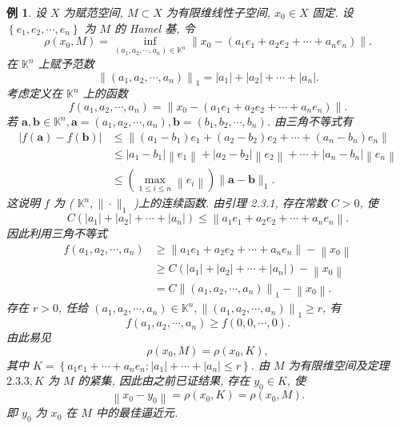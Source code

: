 \documentclass[openany]{ctexbook}
\theoremstyle{kaiti}
\theoremstyle{normal}
\newtheorem{example}{例}[section]
\begin{document}
\begin{example}
设 $X$ 为赋范空间, $M \subset X$ 为有限维线性子空间, $x_0 \in X$ 固定. 设 $\left\{e_1, e_2, \cdots, e_n\right\}$ 为 $M$ 的 Hamel 基, 令
$$
\rho\left(x_0, M\right)=\inf_{\left(a_1, a_2, \cdots, a_n\right) \in \mathbb{K}^n}\left\|x_0-\left(a_1 e_1+a_2 e_2+\cdots+a_n e_n\right)\right\|.
$$
在 $\mathbb{K}^n$ 上赋予范数
$$
\left\|\left(a_1, a_2, \cdots, a_n\right)\right\|_1=\left|a_1\right|+\left|a_2\right|+\cdots+\left|a_n\right|.
$$
考虑定义在 $\mathbb{K}^n$ 上的函数
$$
f\left(a_1, a_2, \cdots, a_n\right)=\left\|x_0-\left(a_1 e_1+a_2 e_2+\cdots+a_n e_n\right)\right\|.
$$
若 $\boldsymbol{a}, \boldsymbol{b} \in \mathbb{K}^n, \boldsymbol{a}=\left(a_1, a_2, \cdots, a_n\right), \boldsymbol{b}=\left(b_1, b_2, \cdots, b_n\right)$. 由三角不等式有
$$
\begin{aligned}
|f(\boldsymbol{a})-f(\boldsymbol{b})| & \leqslant\left\|\left(a_1-b_1\right) e_1+\left(a_2-b_2\right) e_2+\cdots+\left(a_n-b_n\right) e_n\right\| \\
& \leqslant\left|a_1-b_1\right|\left\|e_1\right\|+\left|a_2-b_2\right|\left\|e_2\right\|+\cdots+\left|a_n-b_n\right|\left\|e_n\right\| \\
& \leqslant\left(\max_{1 \leqslant i \leqslant n}\left\|e_{i}\right\|\right)\|\boldsymbol{a}-\boldsymbol{b}\|_1.
\end{aligned}
$$
这说明 $f$ 为 ( $\mathbb{K}^n,\|\cdot\|_1$ )上的连续函数. 由引理 2.3.1, 存在常数 $C>0$, 使
$$
C\left(\left|a_1\right|+\left|a_2\right|+\cdots+\left|a_n\right|\right) \leqslant\left\|a_1 e_1+a_2 e_2+\cdots+a_n e_n\right\|.
$$
因此利用三角不等式
$$
\begin{aligned}
f\left(a_1, a_2, \cdots, a_n\right) & \geqslant\left\|a_1 e_1+a_2 e_2+\cdots+a_n e_n\right\|-\left\|x_0\right\| \\
& \geqslant C\left(\left|a_1\right|+\left|a_2\right|+\cdots+\left|a_n\right|\right)-\left\|x_0\right\| \\
&=C\left\|\left(a_1, a_2, \cdots, a_n\right)\right\|_1-\left\|x_0\right\|.
\end{aligned}
$$
存在 $r>0$, 任给 $\left(a_1, a_2, \cdots, a_n\right) \in \mathbb{K}^n,\left\|\left(a_1, a_2, \cdots, a_n\right)\right\|_1 \geqslant r$, 有
$$
f\left(a_1, a_2, \cdots, a_n\right) \geqslant f(0,0, \cdots, 0).
$$
由此易见
$$
\rho\left(x_0, M\right)=\rho\left(x_0, K\right),
$$
其中 $K=\left\{a_1 e_1+\cdots+a_n e_n:\left|a_1\right|+\cdots+\left|a_n\right| \leqslant r\right\}$. 由 $M$ 为有限维空间及定理 $2.3.3, K$ 为 $M$ 的紧集, 因此由之前已证结果, 存在 $y_0 \in K$, 使
$$
\left\|x_0-y_0\right\|=\rho\left(x_0, K\right)=\rho\left(x_0, M\right).
$$
即 $y_0$ 为 $x_0$ 在 $M$ 中的最佳逼近元.
\end{example}
\end{document}
